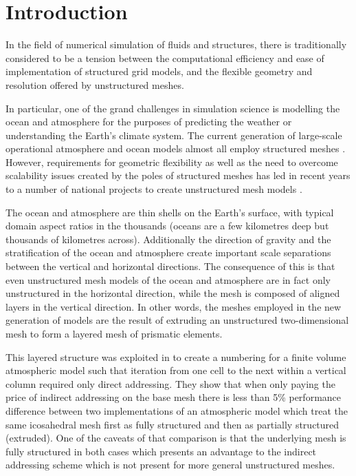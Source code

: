 \documentclass[11pt, a4paper]{scrartcl}
\begin{document}
\section{Introduction}
\label{sec:intro}

In the field of numerical simulation of fluids and structures, there
is traditionally considered to be a tension between the computational
efficiency and ease of implementation of structured grid models, and
the flexible geometry and resolution offered by unstructured meshes.

In particular, one of the grand challenges in simulation science is
modelling the ocean and atmosphere for the purposes of predicting the
weather or understanding the Earth's climate system. The current
generation of large-scale operational atmosphere and ocean models
almost all employ structured meshes \citep{Slingo:2009}. However,
requirements for geometric flexibility as well as the need to overcome
scalability issues created by the poles of structured meshes has led
in recent years to a number of national projects to create
unstructured mesh models \citep{Ford:2013,Zaengl:2015,Skamarock:2012}.

The ocean and atmosphere are thin shells on the Earth's surface, with
typical domain aspect ratios in the thousands (oceans are a few
kilometres deep but thousands of kilometres across). Additionally the
direction of gravity and the stratification of the ocean and
atmosphere create important scale separations between the vertical and
horizontal directions. The consequence of this is that even
unstructured mesh models of the ocean and atmosphere are in fact only
unstructured in the horizontal direction, while the mesh is composed
of aligned layers in the vertical direction. In other words, the
meshes employed in the new generation of models are the result of
extruding an unstructured two-dimensional mesh to form a layered mesh
of prismatic elements.

This layered structure was exploited in \citet{Macdonald:2011}
to create a numbering for a finite volume atmospheric model
such that iteration from one cell to the next within a vertical column
required only direct addressing.  They show that when only paying the
price of indirect addressing on the base mesh there is less than 5\% performance
difference between two implementations of an atmospheric model which treat
the same icosahedral mesh first as fully structured and then as partially
structured (extruded). One of the caveats of that comparison is that the
underlying mesh is fully structured in both cases which presents an
advantage to the indirect addressing scheme which is not present for more
general unstructured meshes.
\end{document}
